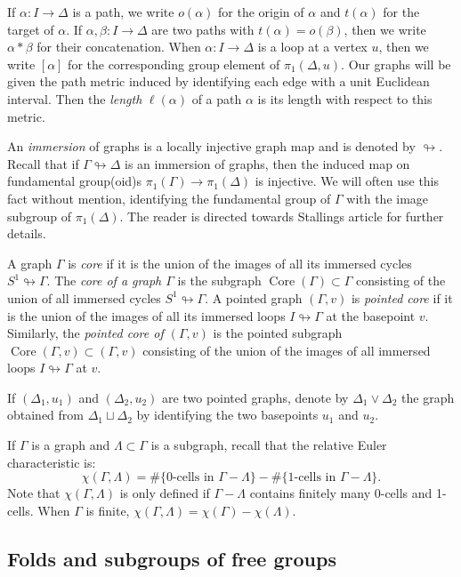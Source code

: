 \documentclass[11pt, a4paper]{amsart}
\theoremstyle{definition}
\def\immerses{\looparrowright}
\DeclareMathOperator{\len}{\ell}
\DeclareMathOperator{\core}{Core}
\begin{document}
If $\alpha\colon I\to \Delta$ is a path, we write $o(\alpha)$ for the origin of $\alpha$ and $t(\alpha)$ for the target of $\alpha$. If $\alpha, \beta\colon I\to \Delta$ are two paths with $t(\alpha) = o(\beta)$, then we write $\alpha*\beta$ for their concatenation. When $\alpha\colon I\to \Delta$ is a loop at a vertex $u$, then we write $[\alpha]$ for the corresponding group element of $\pi_1(\Delta, u)$. Our graphs will be given the path metric induced by identifying each edge with a unit Euclidean interval. Then the \emph{length} $\len(\alpha)$ of a path $\alpha$ is its length with respect to this metric.

An \emph{immersion} of graphs is a locally injective graph map and is denoted by $\immerses$. Recall that if $\Gamma\immerses\Delta$ is an immersion of graphs, then the induced map on fundamental group(oid)s $\pi_1(\Gamma)\to \pi_1(\Delta)$ is injective. We will often use this fact without mention, identifying the fundamental group of $\Gamma$ with the image subgroup of $\pi_1(\Delta)$. The reader is directed towards Stallings article \cite{St83} for further details.

A graph $\Gamma$ is \emph{core} if it is the union of the images of all its immersed cycles $S^1\immerses \Gamma$. The \emph{core of a graph $\Gamma$} is the subgraph $\core(\Gamma)\subset\Gamma$ consisting of the union of all immersed cycles $S^1\immerses\Gamma$. A pointed graph $(\Gamma, v)$ is \emph{pointed core} if it is the union of the images of all its immersed loops $I\immerses \Gamma$  at the basepoint $v$. Similarly, the \emph{pointed core of $(\Gamma, v)$} is the pointed subgraph $\core(\Gamma, v)\subset (\Gamma, v)$ consisting of the union of the images of all immersed loops $I\immerses\Gamma$ at $v$.

If $(\Delta_1, u_1)$ and $(\Delta_2, u_2)$ are two pointed graphs, denote by $\Delta_1\vee \Delta_2$ the graph obtained from $\Delta_1\sqcup\Delta_2$ by identifying the two basepoints $u_1$ and $u_2$.

If $\Gamma$ is a graph and $\Lambda\subset \Gamma$ is a subgraph, recall that the relative Euler characteristic is:
\[
\chi(\Gamma, \Lambda) = \#\{\text{$0$-cells in $\Gamma - \Lambda$}\} - \#\{\text{$1$-cells in $\Gamma - \Lambda$}\}.
\]
Note that $\chi(\Gamma, \Lambda)$ is only defined if $\Gamma - \Lambda$ contains finitely many 0-cells and 1-cells. When $\Gamma$ is finite, $\chi(\Gamma, \Lambda) = \chi(\Gamma) - \chi(\Lambda)$.

\subsection{Folds and subgroups of free groups}
\label{sec:folds}
\end{document}

